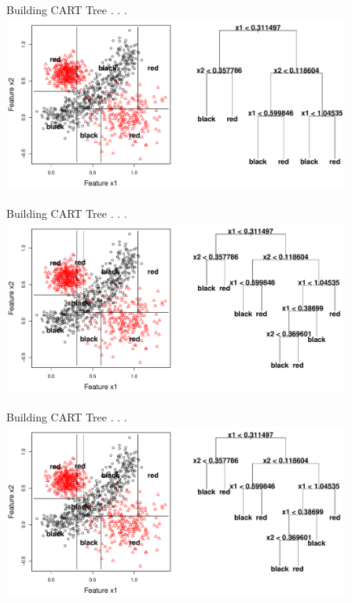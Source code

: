 \documentclass[12pt]{beamer}
\begin{document}
\begin{frame}{Building CART Tree . . .}
\includegraphics[height=2.3in,width=4.5in]{figs/tree_6.pdf}
\end{frame}

\begin{frame}{Building CART Tree . . .}
\includegraphics[height=2.3in,width=4.5in]{figs/tree_7.pdf}
\end{frame}

\begin{frame}{Building CART Tree . . .}
\includegraphics[height=2.3in,width=4.5in]{figs/tree_8.pdf}
\end{frame}


\end{document}

